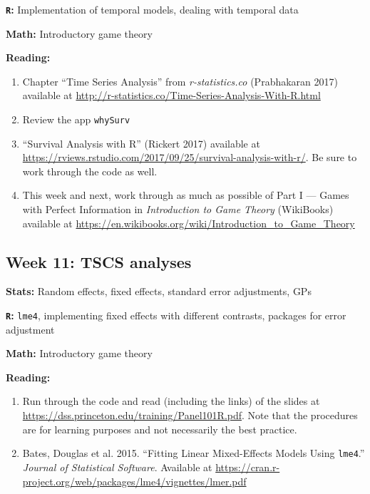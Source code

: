\documentclass[12pt]{article}
\begin{document}
\noindent \textbf{\texttt{R}:} Implementation of temporal models, dealing with temporal data

\noindent \textbf{Math:} Introductory game theory

\noindent \textbf{Reading:}

\begin{enumerate}[1)]

\item Chapter ``Time Series Analysis'' from \emph{r-statistics.co} (Prabhakaran 2017) available at \href{http://r-statistics.co/Time-Series-Analysis-With-R.html}{http://r-statistics.co/Time-Series-Analysis-With-R.html}

\item Review the app \texttt{whySurv}

\item ``Survival Analysis with R'' (Rickert 2017) available at \href{https://rviews.rstudio.com/2017/09/25/survival-analysis-with-r/}{https://rviews.rstudio.com/2017/09/25/survival-analysis-with-r/}. Be sure to work through the code as well.

\item This week and next, work through as much as possible of Part I --- Games with Perfect Information in \emph{Introduction to Game Theory} (WikiBooks) available at \href{https://en.wikibooks.org/wiki/Introduction_to_Game_Theory}{https://en.wikibooks.org/wiki/Introduction\_to\_Game\_Theory}

\end{enumerate}

\subsection*{Week 11: TSCS analyses}

\noindent \textbf{Stats:} Random effects, fixed effects, standard error adjustments, GPs

\noindent \textbf{\texttt{R}:} \texttt{lme4}, implementing fixed effects with different contrasts, packages for error adjustment

\noindent \textbf{Math:} Introductory game theory

\noindent \textbf{Reading:}

\begin{enumerate}[1)]

\item Run through the code and read (including the links) of the slides at \href{https://dss.princeton.edu/training/Panel101R.pdf}{https://dss.princeton.edu/training/Panel101R.pdf}. Note that the procedures are for learning purposes and not necessarily the best practice.

\item Bates, Douglas et al. 2015. ``Fitting Linear Mixed-Effects Models Using \texttt{lme4}.'' \emph{Journal of Statistical Software}. Available at \href{https://cran.r-project.org/web/packages/lme4/vignettes/lmer.pdf}{https://cran.r-project.org/web/packages/lme4/vignettes/lmer.pdf}

\end{enumerate}
\end{document}
